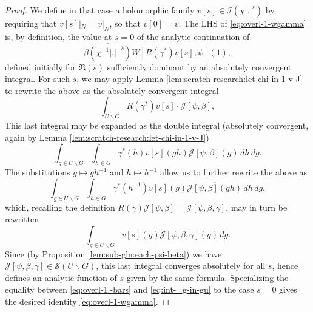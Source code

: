 \begin{proof}
  We define in that case a holomorphic family $v[s] \in \mathcal{I}(\chi |.|^s)$ by requiring that $v[s]|_{N} = v|_N$, so that $v[0] = v$.  The LHS of \eqref{eq:overl-1-wgamma} is, by definition, the value at $s = 0$ of the analytic continuation of
  \begin{equation}\label{eq:overl-1.-bars}
    \overline{\tilde{\beta}(\bar{\chi}^{-1}|.|^{-\bar{s}})}
    W[R(\gamma^*) v[s], \psi](1),
  \end{equation}
  defined initially for $\Re(s)$ sufficiently dominant by an absolutely convergent integral.  For such $s$, we may apply Lemma \ref{lem:scratch-research:let-chi-in-1-v-J} to rewrite the above as the absolutely convergent integral
  \begin{equation*}
    \int_{U \backslash G}
    R(\gamma^*) v[s] \cdot
    \overline{\mathcal{J}[\psi,\beta]},
  \end{equation*}
  This last integral may be expanded as the double integral (absolutely convergent, again by Lemma \ref{lem:scratch-research:let-chi-in-1-v-J})
  \begin{equation*}
    \int_{g \in U \backslash G}
    \int_{h \in G} \gamma^*(h)
    v[s](g h) \overline{\mathcal{J}[\psi,\beta](g)} \, d h \, d g.
  \end{equation*}
  The substitutions $g \mapsto g h^{-1}$  and $h \mapsto h^{-1}$ allow us to further rewrite the above as
  \begin{equation*}
    \int_{g \in U \backslash G}
    \int_{h \in G} \gamma^*(h^{-1})
    v[s](g) \overline{\mathcal{J}[\psi,\beta](g h)} \, d h \, d g,
  \end{equation*}
  which, recalling the definition $R(\gamma) \mathcal{J}[\psi,\beta] = \mathcal{J}[\psi,\beta,\gamma]$, may in turn be rewritten
  \begin{equation}\label{eq:int-_g-in-gu}
    \int_{g \in U \backslash G}
    v[s](g) \overline{\mathcal{J}[\psi,\beta,\gamma](g)} \, d g.
  \end{equation}
  Since (by Proposition \ref{lem:sub-gln:each-psi-beta}) we have $\mathcal{J}[\psi,\beta,\gamma] \in \mathcal{S}(U \backslash G)$, this last integral converges absolutely for all $s$, hence defines an analytic function of $s$ given by the same formula.  Specializing the equality between \eqref{eq:overl-1.-bars} and \eqref{eq:int-_g-in-gu} to the case $s = 0$ gives the desired identity \eqref{eq:overl-1-wgamma}.
\end{proof}

